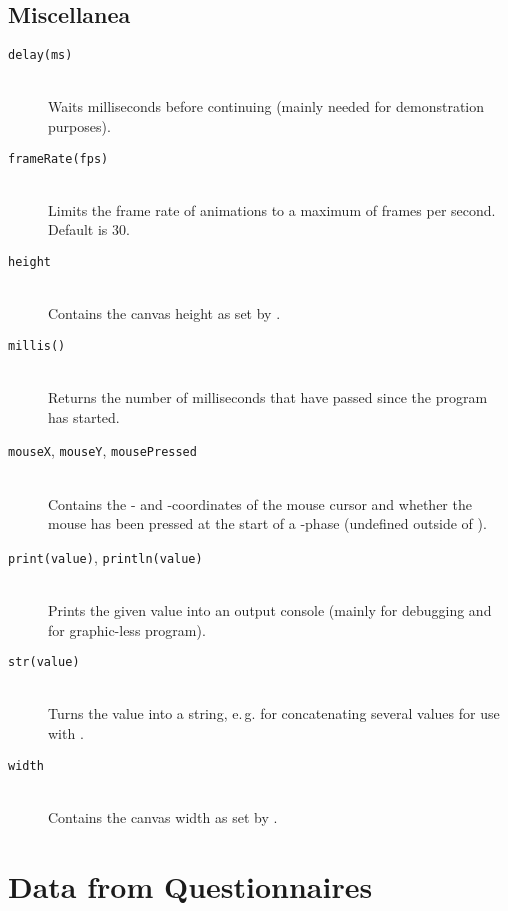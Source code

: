 \section{Miscellanea}
\begin{description}
\item[\texttt{delay(ms)}] \hfill \\
	Waits  milliseconds before continuing (mainly needed for demonstration purposes).
\item[\texttt{frameRate(fps)}] \hfill \\
	Limits the frame rate of animations to a maximum of  frames per second. Default is 30.
\item[\texttt{height}] \hfill \\
	Contains the canvas height as set by .
\item[\texttt{millis()}] \hfill \\
	Returns the number of milliseconds that have passed since the program has started.
\item[\texttt{mouseX}, \texttt{mouseY}, \texttt{mousePressed}] \hfill \\
	Contains the - and -coordinates of the mouse cursor and whether the mouse has been pressed at the start of a -phase (undefined outside of ).
\item[\texttt{print(value)}, \texttt{println(value)}] \hfill \\
	Prints the given value into an output console (mainly for debugging and for graphic-less program).
\item[\texttt{str(value)}] \hfill \\
	Turns the value into a string, e.\,g. for concatenating several values for use with .
\item[\texttt{width}] \hfill \\
	Contains the canvas width as set by .
\end{description}



\chapter{Data from Questionnaires} \label{app_data}
